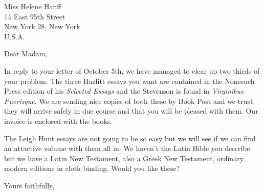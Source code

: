\documentclass{letter}
\date{25th October, 1949}
\begin{document}
\begin{letter}{Miss Helene Hanff\\14 East 95th Street\\New York 28, New York\\U.S.A.}
\opening{Dear Madam,}

In reply to your letter of October 5th, we have managed to clear up two thirds of your problem. The three Hazlitt essays you want are contained in the Nonesuch Press edition of his \textit{Selected Essays} and the Stevenson is found in \textit{Virginibus Puerisque}. We are sending nice copies of both these by Book Post and we trust they will arrive safely in due course and that you will be pleased with them. Our invoice is enclosed with the books.

The Leigh Hunt essays are not going to be so easy but we will see if we can find an attactive volume with them all in. We haven't the Latin Bible you describe but we have a Latin New Testament, also a Greek New Testament, ordinary modern editions in cloth binding. Would you like these?

\closing{Yours faithfully,}
\end{letter}
\end{document}
